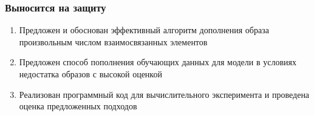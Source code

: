 \documentclass[10pt]{beamer}
\begin{document}
\begin{frame}
	\frametitle{Выносится на защиту}
		\begin{enumerate}
			\item Предложен и обоснован эффективный алгоритм дополнения образа произвольным числом взаимосвязанных элементов
			\item Предложен способ пополнения обучающих данных для модели в условиях недостатка образов с высокой оценкой
			\item Реализован программный код для вычислительного эксперимента и проведена оценка предложенных подходов				
		\end{enumerate}
\end{frame}
\end{document}
